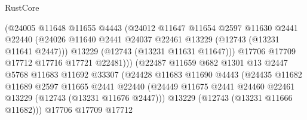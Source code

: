 \begin{lexlean}{RustCore}
\begin{coremodule}
                                  (@24005
                                    @11648
                                    @11655
                                    @4443
                                    (@24012
                                      @11647
                                      @11654
                                      @2597
                                      @11630
                                      @2441
                                      @22440
                                      (@24026
                                        @11640
                                        @2441
                                        @24037
                                        @22461
                                        @13229
                                        (@12743 (@13231 @11641 @2447)))
                                      @13229
                                      (@12743 (@13231 @11631 @11647)))
                                    @17706
                                    @17709
                                    @17712
                                    @17716
                                    @17721
                                    @22481)))
                              (@22487
                                @11659
                                @682
                                @1301
                                @13
                                @2447
                                @5768
                                @11683
                                @11692
                                @33307
                                (@24428
                                  @11683
                                  @11690
                                  @4443
                                  (@24435
                                    @11682
                                    @11689
                                    @2597
                                    @11665
                                    @2441
                                    @22440
                                    (@24449
                                      @11675
                                      @2441
                                      @24460
                                      @22461
                                      @13229
                                      (@12743 (@13231 @11676 @2447)))
                                    @13229
                                    (@12743 (@13231 @11666 @11682)))
                                  @17706
                                  @17709
                                  @17712

\end{coremodule}
\end{lexlean}
